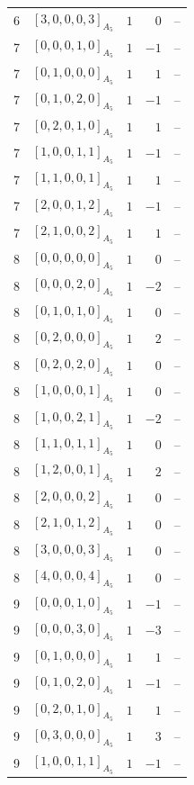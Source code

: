 \documentclass[11pt]{article}
\newcommand{\Dynkin}[1]{#1}
\begin{document}
\begin{longtable}{r l r r l}
6 & $\Dynkin{[3,0,0,0,3]_{A_5}}$ & $1$ & $0$ & --\\
7 & $\Dynkin{[0,0,0,1,0]_{A_5}}$ & $1$ & $-1$ & --\\
7 & $\Dynkin{[0,1,0,0,0]_{A_5}}$ & $1$ & $1$ & --\\
7 & $\Dynkin{[0,1,0,2,0]_{A_5}}$ & $1$ & $-1$ & --\\
7 & $\Dynkin{[0,2,0,1,0]_{A_5}}$ & $1$ & $1$ & --\\
7 & $\Dynkin{[1,0,0,1,1]_{A_5}}$ & $1$ & $-1$ & --\\
7 & $\Dynkin{[1,1,0,0,1]_{A_5}}$ & $1$ & $1$ & --\\
7 & $\Dynkin{[2,0,0,1,2]_{A_5}}$ & $1$ & $-1$ & --\\
7 & $\Dynkin{[2,1,0,0,2]_{A_5}}$ & $1$ & $1$ & --\\
8 & $\Dynkin{[0,0,0,0,0]_{A_5}}$ & $1$ & $0$ & --\\
8 & $\Dynkin{[0,0,0,2,0]_{A_5}}$ & $1$ & $-2$ & --\\
8 & $\Dynkin{[0,1,0,1,0]_{A_5}}$ & $1$ & $0$ & --\\
8 & $\Dynkin{[0,2,0,0,0]_{A_5}}$ & $1$ & $2$ & --\\
8 & $\Dynkin{[0,2,0,2,0]_{A_5}}$ & $1$ & $0$ & --\\
8 & $\Dynkin{[1,0,0,0,1]_{A_5}}$ & $1$ & $0$ & --\\
8 & $\Dynkin{[1,0,0,2,1]_{A_5}}$ & $1$ & $-2$ & --\\
8 & $\Dynkin{[1,1,0,1,1]_{A_5}}$ & $1$ & $0$ & --\\
8 & $\Dynkin{[1,2,0,0,1]_{A_5}}$ & $1$ & $2$ & --\\
8 & $\Dynkin{[2,0,0,0,2]_{A_5}}$ & $1$ & $0$ & --\\
8 & $\Dynkin{[2,1,0,1,2]_{A_5}}$ & $1$ & $0$ & --\\
8 & $\Dynkin{[3,0,0,0,3]_{A_5}}$ & $1$ & $0$ & --\\
8 & $\Dynkin{[4,0,0,0,4]_{A_5}}$ & $1$ & $0$ & --\\
9 & $\Dynkin{[0,0,0,1,0]_{A_5}}$ & $1$ & $-1$ & --\\
9 & $\Dynkin{[0,0,0,3,0]_{A_5}}$ & $1$ & $-3$ & --\\
9 & $\Dynkin{[0,1,0,0,0]_{A_5}}$ & $1$ & $1$ & --\\
9 & $\Dynkin{[0,1,0,2,0]_{A_5}}$ & $1$ & $-1$ & --\\
9 & $\Dynkin{[0,2,0,1,0]_{A_5}}$ & $1$ & $1$ & --\\
9 & $\Dynkin{[0,3,0,0,0]_{A_5}}$ & $1$ & $3$ & --\\
9 & $\Dynkin{[1,0,0,1,1]_{A_5}}$ & $1$ & $-1$ & --\\

\end{longtable}
\end{document}
